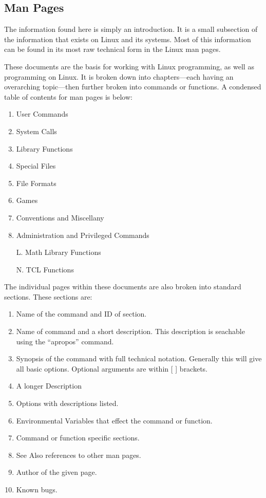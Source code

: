 			\FloatBarrier
		\subsection{Man Pages}
			The information found here is simply an introduction.
			It is a small subsection of the information that exists on Linux and its systems.
			Most of this information can be found in its most raw technical form in the Linux man pages.

			These documents are the basis for working with Linux programming, as well as programming on Linux.
			It is broken down into chapters---each having an overarching topic---then further broken into commands or functions.
			A condensed table of contents for man pages is below:
			\begin{enumerate}
				\item User Commands
				\item System Calls
				\item Library Functions
				\item Special Files
				\item File Formats
				\item Games
				\item Conventions and Miscellany
				\item Administration and Privileged Commands
				\item[L.] Math Library Functions
				\item[N.] TCL Functions
			\end{enumerate}

			The individual pages within these documents are also broken into standard sections.
			These sections are:
			\begin{enumerate}
				\item Name of the command and ID of section.
				\item Name of command and a short description.
					This description is seachable using the ``apropos'' command.
				\item Synopsis of the command with full technical notation.
					Generally this will give all basic options.
					Optional arguments are within [ ] brackets.
				\item A longer Description
				\item Options with descriptions listed.
				\item Environmental Variables that effect the command or function.
				\item Command or function specific sections.
				\item See Also references to other man pages.
				\item Author of the given page.
				\item Known bugs.
			\end{enumerate}

